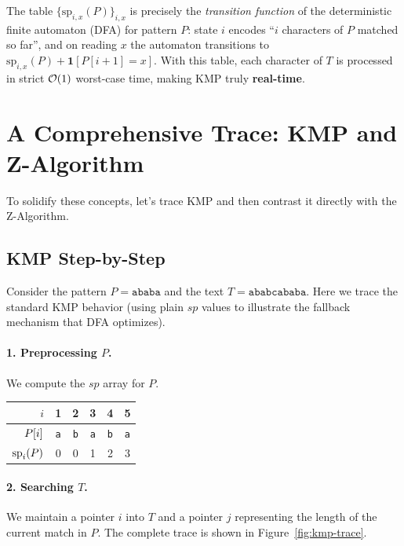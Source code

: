 The table $\{\mathrm{sp}_{i,x}(P)\}_{i,x}$ is precisely the \emph{transition function} of
the deterministic finite automaton (DFA) for pattern $P$: state $i$ encodes ``$i$ characters
of $P$ matched so far'', and on reading $x$ the automaton transitions to
$\mathrm{sp}_{i,x}(P) + \mathbf{1}[P[i+1]=x]$.
With this table, each character of $T$ is processed in strict $\mathcal{O}\!\left(1\right)$ worst-case time, making
KMP truly \textbf{real-time}.


\section{A Comprehensive Trace: KMP and Z-Algorithm}

To solidify these concepts, let's trace KMP and then contrast it directly with the Z-Algorithm.

\subsection{KMP Step-by-Step}

Consider the pattern $P = \texttt{ababa}$ and the text $T = \texttt{ababcababa}$.
Here we trace the standard KMP behavior (using plain $sp$ values to illustrate the fallback mechanism that DFA optimizes).

\paragraph{1. Preprocessing $P$.}
We compute the $sp$ array for $P$.
\begin{center}
\begin{tabular}{rccccc}
  \toprule
  $i$    & 1 & 2 & 3 & 4 & 5 \\
  \midrule
  $P\kern0pt[i]$ & \texttt{a} & \texttt{b} & \texttt{a} & \texttt{b} & \texttt{a} \\
  $\mathrm{sp}_{i}(P)$ & 0 & 0 & 1 & 2 & 3 \\
  \bottomrule
\end{tabular}
\end{center}

\paragraph{2. Searching $T$.}
We maintain a pointer $i$ into $T$ and a pointer $j$ representing the length of the current match in $P$.
The complete trace is shown in Figure~\ref{fig:kmp-trace}.

